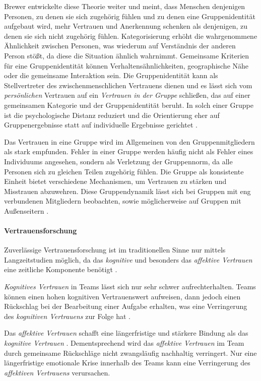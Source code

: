 \documentclass[a4paper,11pt]{article}%
\renewcommand{\\}{\vspace*{0.5\baselineskip} \newline}
\begin{document}
Brewer \citep{brewer1981} entwickelte diese Theorie weiter und meint, dass Menschen denjenigen Personen, zu denen sie sich zugehörig fühlen und zu denen eine Gruppenidentität aufgebaut wird, mehr Vertrauen und Anerkennung schenken als denjenigen, zu denen sie sich nicht zugehörig fühlen. Kategorisierung erhöht die wahrgenommene Ähnlichkeit zwischen Personen, was wiederum auf Verständnis der anderen Person stößt, da diese die Situation ähnlich wahrnimmt.
Gemeinsame Kriterien für eine Gruppenidentität können Verhaltensähnlichkeiten, geographische Nähe oder die gemeinsame Interaktion sein. Die Gruppenidentität kann als Stellvertreter des zwischenmenschlichen Vertrauens dienen und es lässt sich vom \textit{persönlichen} Vertrauen auf ein \textit{Vertrauen in der Gruppe} schließen, das auf einer gemeinsamen Kategorie und der Gruppenidentität beruht.
In solch einer Gruppe ist die psychologische Distanz reduziert und die Orientierung eher auf Gruppenergebnisse statt auf individuelle Ergebnisse gerichtet \citep[355-360]{brewer1981}.

Das Vertrauen in eine Gruppe wird im Allgemeinen von den Gruppenmitgliedern als stark empfunden. Fehler in einer Gruppe werden häufig nicht als Fehler eines Individuums angesehen, sondern als Verletzung der Gruppennorm, da alle Personen sich zu gleichen Teilen zugehörig fühlen. Die Gruppe als konsistente Einheit bietet verschiedene Mechanismen, um Vertrauen zu stärken und Misstrauen abzuwehren. Diese Gruppendynamik lässt sich bei Gruppen mit eng verbundenen Mitgliedern beobachten, sowie möglicherweise auf Gruppen mit Außenseitern \citep[397-403]{stolle2002trusting}.

\paragraph{Vertrauensforschung}
\label{Vertrauensforschung}
Zuverlässige Vertrauensforschung ist im traditionellen Sinne nur mittels Langzeitstudien möglich, da das \textit{kognitive} und besonders das \textit{affektive Vertrauen} eine zeitliche Komponente benötigt \citep{jones1998experience}.

\textit{Kognitives Vertrauen} in Teams lässt sich nur sehr schwer aufrechterhalten. Teams können einen hohen kognitiven Vertrauenswert aufweisen, dann jedoch einen Rückschlag bei der Bearbeitung einer Aufgabe erhalten, was eine Verringerung des \textit{kognitiven Vertrauens} zur Folge hat \citep[S. 29-31]{mcallister1995affect}.

Das \textit{affektive Vertrauen} schafft eine längerfristige und stärkere Bindung als das \textit{kognitive Vertrauen} \citep[S. 29-31]{mcallister1995affect}.
Dementsprechend wird das \textit{affektive Vertrauen} im Team durch gemeinsame Rückschläge nicht zwangsläufig nachhaltig verringert. Nur eine längerfristige emotionale Krise innerhalb des Teams kann eine Verringerung des \textit{affektiven Vertrauens} verursachen. 
\end{document}
